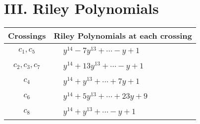 \documentclass[1p]{elsarticle_modified}
\theoremstyle{definition}
\begin{document}
\centering \section*{ III. Riley Polynomials}
\begin{tabular}{m{50pt}|m{274pt}}
Crossings & \hspace{64pt}Riley Polynomials at each crossing \\
\hline $$\begin{aligned}c_{1},c_{5}\end{aligned}$$&$\begin{aligned}
&y^{14}-7 y^{13}+\cdots- y+1
\end{aligned}$\\
\hline $$\begin{aligned}c_{2},c_{3},c_{7}\end{aligned}$$&$\begin{aligned}
&y^{14}+13 y^{13}+\cdots- y+1
\end{aligned}$\\
\hline $$\begin{aligned}c_{4}\end{aligned}$$&$\begin{aligned}
&y^{14}+y^{13}+\cdots+7 y+1
\end{aligned}$\\
\hline $$\begin{aligned}c_{6}\end{aligned}$$&$\begin{aligned}
&y^{14}+5 y^{13}+\cdots+23 y+9
\end{aligned}$\\
\hline $$\begin{aligned}c_{8}\end{aligned}$$&$\begin{aligned}
&y^{14}+y^{13}+\cdots- y+1
\end{aligned}$\\
\hline
\end{tabular}
\vskip 2pc
\end{document}
